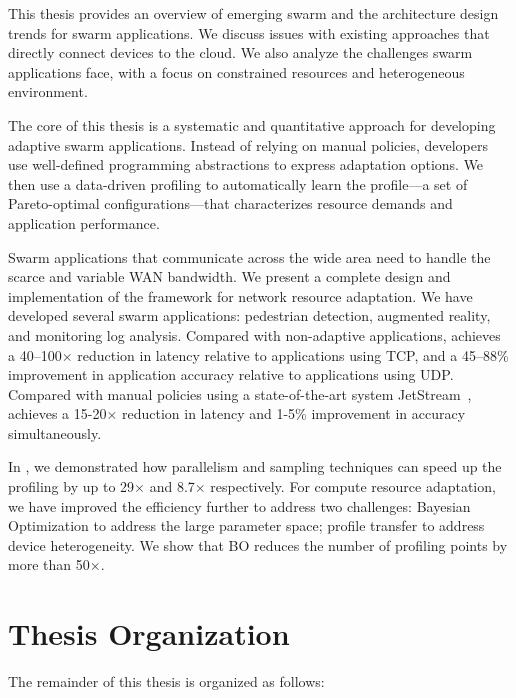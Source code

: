 \documentclass[thesis.tex]{subfiles}
\begin{document}
 This thesis provides an overview of
emerging swarm and the architecture design trends for swarm applications. We
discuss issues with existing approaches that directly connect devices to the
cloud. We also analyze the challenges swarm applications face, with a focus on
constrained resources and heterogeneous environment.

 The core of this thesis is a
systematic and quantitative approach for developing adaptive swarm
applications. Instead of relying on manual policies, developers use well-defined
programming abstractions to express adaptation options. We then use a
data-driven profiling to automatically learn the profile---a set of
Pareto-optimal configurations---that characterizes resource demands and
application performance.

 Swarm applications
that communicate across the wide area need to handle the scarce and variable WAN
bandwidth. We present a complete design and implementation of the framework
\awstream{} for network resource adaptation. We have developed several swarm
applications: pedestrian detection, augmented reality, and monitoring log
analysis. Compared with non-adaptive applications, \awstream{} achieves a
40--100$\times$ reduction in latency relative to applications using TCP, and a
45--88\% improvement in application accuracy relative to applications using
UDP. Compared with manual policies using a state-of-the-art system
JetStream~\cite{rabkin2014aggregation}, \awstream{} achieves a 15-20$\times$
reduction in latency and 1-5\% improvement in accuracy simultaneously.

 In \awstream{}, we demonstrated how
parallelism and sampling techniques can speed up the profiling by up to
29$\times$ and 8.7$\times$ respectively. For compute resource adaptation, we
have improved the efficiency further to address two challenges: Bayesian
Optimization to address the large parameter space; profile transfer to address
device heterogeneity. We show that BO reduces the number of profiling points by
more than 50$\times$.

\section{Thesis Organization}
\label{sec:thesis-organization}

The remainder of this thesis is organized as follows:
\end{document}
